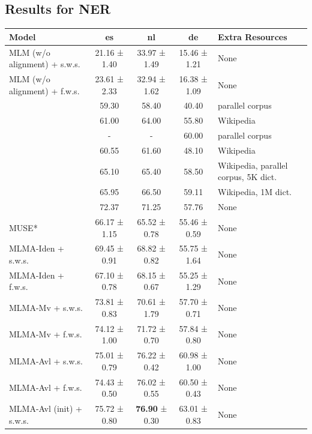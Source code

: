 \documentclass[11pt,a4paper]{article}
\begin{document}
	\subsection{Results for NER} \label{sec:result_ner}
	\begin{table}[th]
		\small
		\centering
		\begin{tabular}{l c c c l} 
			Model  &  es & nl & de & Extra Resources\\
			\hline
			MLM (w/o alignment) + s.w.s. & 21.16 ± 1.40 & 33.97 ± 1.49 & 15.46 ± 1.21 & None\\
			MLM (w/o alignment) + f.w.s. & 23.61 ± 2.33 & 32.94 ± 1.62 & 16.38 ± 1.09 & None\\
			\hline
			\newcite{tackstrom12cross} & 59.30 & 58.40 & 40.40 & parallel corpus\\
			\newcite{nothman13learning} & 61.00 & 64.00 & 55.80 & Wikipedia\\
			\newcite{wang14cross} & - & - & 60.00 & parallel corpus\\
			\newcite{tsai16cross} & 60.55 & 61.60 & 48.10 & Wikipedia\\
			\newcite{ni17weakly} & 65.10 & 65.40 & 58.50 & Wikipedia, parallel corpus, 5K dict.\\
			\newcite{mayhew17cheap} & 65.95 & 66.50 & 59.11 & Wikipedia, 1M dict.\\
			\newcite{xie2018neural} & 72.37 & 71.25 & 57.76 & None\\
			MUSE* & 66.17 ± 1.15 & 65.52 ± 0.78 & 55.46 ± 0.59 & None\\
			\hline
			MLMA-Iden + s.w.s. & 69.45 ± 0.91 & 68.82 ± 0.82 & 55.75 ± 1.64 & None\\
			MLMA-Iden + f.w.s. & 67.10 ± 0.78 & 68.15 ± 0.67 & 55.25 ± 1.29 & None\\
			MLMA-Mv + s.w.s. & 73.81 ± 0.83 & 70.61 ± 1.79 & 57.70 ± 0.71 &  None\\
			MLMA-Mv + f.w.s. & 74.12 ± 1.00 & 71.72 ± 0.70 & 57.84 ± 0.80 &  None\\
			MLMA-Avl + s.w.s. & 75.01 ± 0.79 & 76.22 ± 0.42 & 60.98 ± 1.00 & None \\
			MLMA-Avl + f.w.s. & 74.43 ± 0.50 & 76.02 ± 0.55 & 60.50 ± 0.43 & None \\
			MLMA-Avl (init) + s.w.s. & 75.72 ± 0.80 & \textbf{76.90} ± 0.30 & 63.01 ± 0.83 & None\\

\end{tabular}
\end{table}
\end{document}
